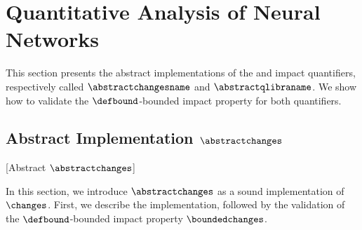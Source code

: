 



\section{Quantitative Analysis of Neural Networks}


This section presents the abstract implementations of the \changesname{} and \qlibraname{} impact quantifiers, respectively called $\abstractchangesname$ and $\abstractqlibraname$.
We show how to validate the $\defbound$-bounded impact property for both quantifiers.


\subsection{Abstract Implementation \texorpdfstring{$\abstractchanges$}{Abstract Changes}}[Abstract \texorpdfstring{$\abstractchanges$}{Changes}]

In this section, we introduce $\abstractchanges$ as a sound implementation of $\changes$.
First, we describe the implementation, followed by the validation of the $\defbound$-bounded impact property $\boundedchanges$.


